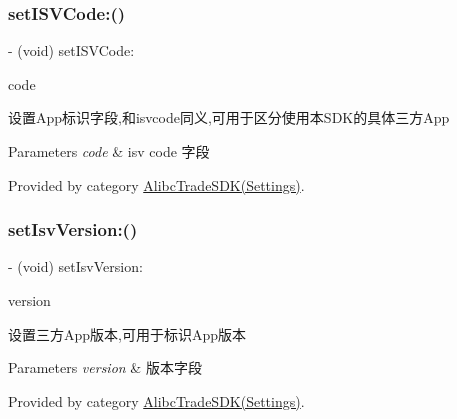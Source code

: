 \subsubsection{\texorpdfstring{set\+I\+S\+V\+Code\+:()}{setISVCode:()}}
{\footnotesize\ttfamily -\/ (void) set\+I\+S\+V\+Code\+: \begin{DoxyParamCaption}\item[{(N\+S\+String $\ast$)}]{code }\end{DoxyParamCaption}}

设置\+App标识字段,和isvcode同义,可用于区分使用本\+S\+D\+K的具体三方\+App


\begin{DoxyParams}{Parameters}
{\em code} & isv code 字段 \\
\hline
\end{DoxyParams}


Provided by category \mbox{\hyperlink{category_alibc_trade_s_d_k_07_settings_08_a9e2f6b18663323c17cdcfa8fc42e0c32}{Alibc\+Trade\+S\+D\+K(\+Settings)}}.

\mbox{\label{interface_alibc_trade_s_d_k_aaf25692948a3bcad5f2099789c92b5c8}} 
\subsubsection{\texorpdfstring{set\+Isv\+Version\+:()}{setIsvVersion:()}}
{\footnotesize\ttfamily -\/ (void) set\+Isv\+Version\+: \begin{DoxyParamCaption}\item[{(N\+S\+String $\ast$)}]{version }\end{DoxyParamCaption}}

设置三方\+App版本,可用于标识\+App版本


\begin{DoxyParams}{Parameters}
{\em version} & 版本字段 \\
\hline
\end{DoxyParams}


Provided by category \mbox{\hyperlink{category_alibc_trade_s_d_k_07_settings_08_aaf25692948a3bcad5f2099789c92b5c8}{Alibc\+Trade\+S\+D\+K(\+Settings)}}.

\mbox{\label{interface_alibc_trade_s_d_k_aacfcf26210f84b53ce09dd44e68dd91a}} 
